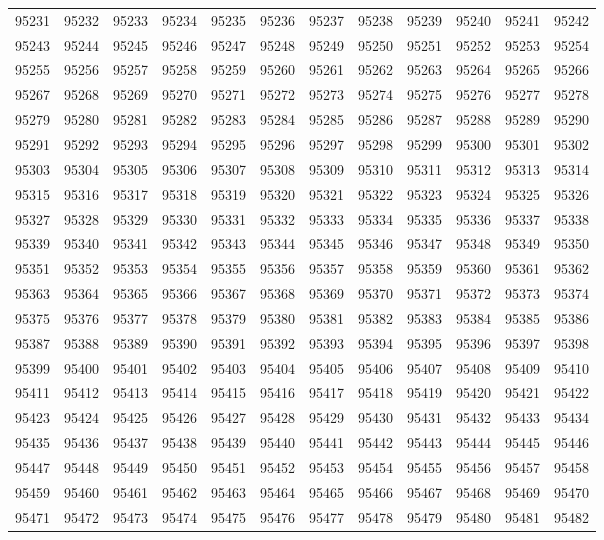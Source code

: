 \begin{center}
\begin{longtable}{llllllllllll}
95231 &95232 &95233 &95234 &95235 &95236 &95237 &95238 &95239 &95240 &95241 &95242 \\
95243 &95244 &95245 &95246 &95247 &95248 &95249 &95250 &95251 &95252 &95253 &95254 \\
95255 &95256 &95257 &95258 &95259 &95260 &95261 &95262 &95263 &95264 &95265 &95266 \\
95267 &95268 &95269 &95270 &95271 &95272 &95273 &95274 &95275 &95276 &95277 &95278 \\
95279 &95280 &95281 &95282 &95283 &95284 &95285 &95286 &95287 &95288 &95289 &95290 \\
95291 &95292 &95293 &95294 &95295 &95296 &95297 &95298 &95299 &95300 &95301 &95302 \\
95303 &95304 &95305 &95306 &95307 &95308 &95309 &95310 &95311 &95312 &95313 &95314 \\
95315 &95316 &95317 &95318 &95319 &95320 &95321 &95322 &95323 &95324 &95325 &95326 \\
95327 &95328 &95329 &95330 &95331 &95332 &95333 &95334 &95335 &95336 &95337 &95338 \\
95339 &95340 &95341 &95342 &95343 &95344 &95345 &95346 &95347 &95348 &95349 &95350 \\
95351 &95352 &95353 &95354 &95355 &95356 &95357 &95358 &95359 &95360 &95361 &95362 \\
95363 &95364 &95365 &95366 &95367 &95368 &95369 &95370 &95371 &95372 &95373 &95374 \\
95375 &95376 &95377 &95378 &95379 &95380 &95381 &95382 &95383 &95384 &95385 &95386 \\
95387 &95388 &95389 &95390 &95391 &95392 &95393 &95394 &95395 &95396 &95397 &95398 \\
95399 &95400 &95401 &95402 &95403 &95404 &95405 &95406 &95407 &95408 &95409 &95410 \\
95411 &95412 &95413 &95414 &95415 &95416 &95417 &95418 &95419 &95420 &95421 &95422 \\
95423 &95424 &95425 &95426 &95427 &95428 &95429 &95430 &95431 &95432 &95433 &95434 \\
95435 &95436 &95437 &95438 &95439 &95440 &95441 &95442 &95443 &95444 &95445 &95446 \\
95447 &95448 &95449 &95450 &95451 &95452 &95453 &95454 &95455 &95456 &95457 &95458 \\
95459 &95460 &95461 &95462 &95463 &95464 &95465 &95466 &95467 &95468 &95469 &95470 \\
95471 &95472 &95473 &95474 &95475 &95476 &95477 &95478 &95479 &95480 &95481 &95482 \\

\end{longtable}
\end{center}
